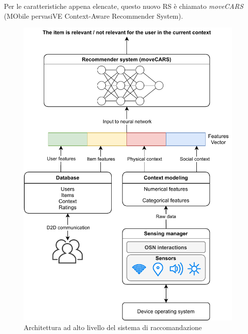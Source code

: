 \documentclass[12pt,italian]{report}
\begin{document}
Per le caratteristiche appena elencate, questo nuovo RS è chiamato \textit{moveCARS} (MObile pervasiVE Context-Aware Recommender System).

\begin{figure}
  \centering
  \includegraphics[width=\linewidth]{immagini/full_RS.pdf}
  \caption{Architettura ad alto livello del sistema di raccomandazione}
  \label{fig:full_RS}
\end{figure}
\end{document}
